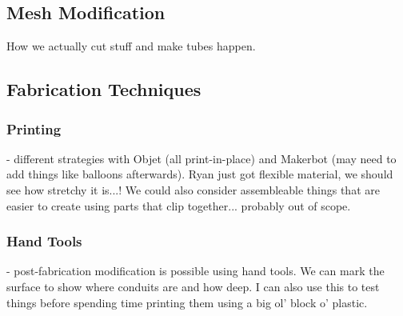 \subsection{Mesh Modification}

How we actually cut stuff and make tubes happen. 

\subsection{Fabrication Techniques}

\subsubsection{Printing} - different strategies with Objet (all print-in-place) and Makerbot (may need to add things like balloons afterwards).  Ryan just got flexible material, we should see how stretchy it is...!  We could also consider assembleable things that are easier to create using parts that clip together... probably out of scope.

\subsubsection{Hand Tools} - post-fabrication modification is possible using hand tools.  We can mark the surface to show where conduits are and how deep.  I can also use this to test things before spending time printing them using a big ol' block o' plastic.